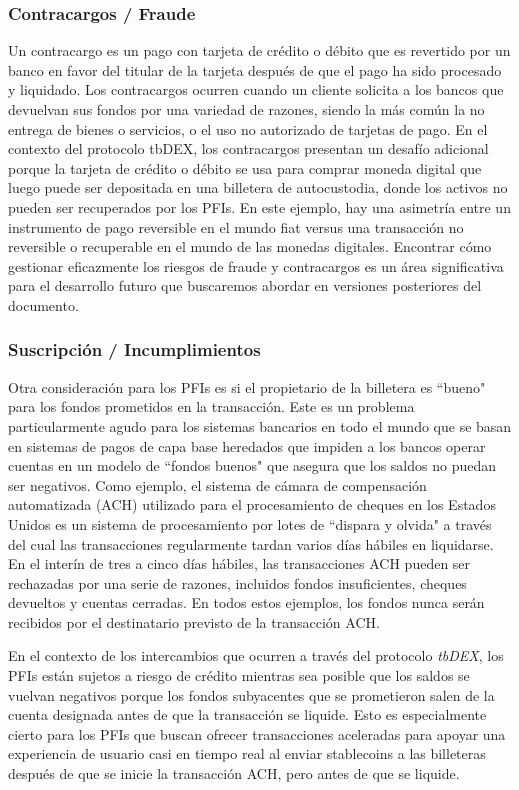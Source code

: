 \documentclass[11pt]{article}
\begin{document}
\subsubsection{Contracargos / Fraude}

Un contracargo es un pago con tarjeta de crédito o débito que es revertido por un banco en favor del titular de la tarjeta después de que el pago ha sido procesado y liquidado. Los contracargos ocurren cuando un cliente solicita a los bancos que devuelvan sus fondos por una variedad de razones, siendo la más común la no entrega de bienes o servicios, o el uso no autorizado de tarjetas de pago. En el contexto del protocolo tbDEX, los contracargos presentan un desafío adicional porque la tarjeta de crédito o débito se usa para comprar moneda digital que luego puede ser depositada en una billetera de autocustodia, donde los activos no pueden ser recuperados por los PFIs. En este ejemplo, hay una asimetría entre un instrumento de pago reversible en el mundo fiat versus una transacción no reversible o recuperable en el mundo de las monedas digitales. Encontrar cómo gestionar eficazmente los riesgos de fraude y contracargos es un área significativa para el desarrollo futuro que buscaremos abordar en versiones posteriores del documento.

\subsubsection{Suscripción / Incumplimientos}

Otra consideración para los PFIs es si el propietario de la billetera es ``bueno" para los fondos prometidos en la transacción. Este es un problema particularmente agudo para los sistemas bancarios en todo el mundo que se basan en sistemas de pagos de capa base heredados que impiden a los bancos operar cuentas en un modelo de ``fondos buenos" que asegura que los saldos no puedan ser negativos. Como ejemplo, el sistema de cámara de compensación automatizada (ACH) utilizado para el procesamiento de cheques en los Estados Unidos es un sistema de procesamiento por lotes de ``dispara y olvida" a través del cual las transacciones regularmente tardan varios días hábiles en liquidarse. En el interín de tres a cinco días hábiles, las transacciones ACH pueden ser rechazadas por una serie de razones, incluidos fondos insuficientes, cheques devueltos y cuentas cerradas. En todos estos ejemplos, los fondos nunca serán recibidos por el destinatario previsto de la transacción ACH.

\vspace{1\baselineskip}
En el contexto de los intercambios que ocurren a través del protocolo \textit{tbDEX}, los PFIs están sujetos a riesgo de crédito mientras sea posible que los saldos se vuelvan negativos porque los fondos subyacentes que se prometieron salen de la cuenta designada antes de que la transacción se liquide. Esto es especialmente cierto para los PFIs que buscan ofrecer transacciones aceleradas para apoyar una experiencia de usuario casi en tiempo real al enviar stablecoins a las billeteras después de que se inicie la transacción ACH, pero antes de que se liquide.
\end{document}
